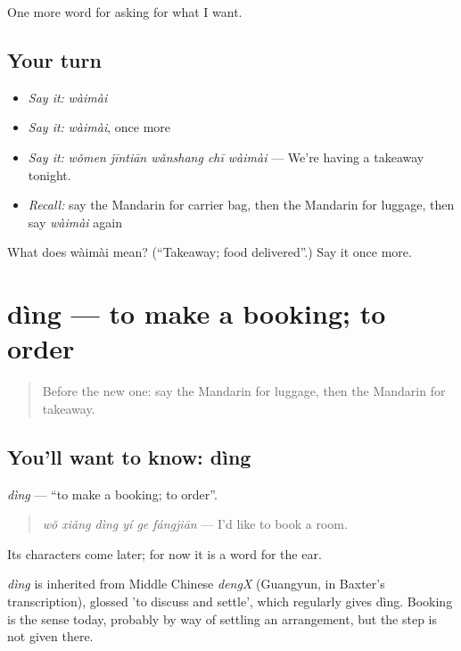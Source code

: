 \begin{grammarlens}[title={What you've built}]
One more word for asking for what I want.
\end{grammarlens}

\subsection*{Your turn}
\begin{itemize}
\raggedright
  \item \emph{Say it:} \emph{wàimài}
  \item \emph{Say it:} \emph{wàimài}, once more
  \item \emph{Say it:} \emph{wǒmen jīntiān wǎnshang chī wàimài} — We're having a takeaway tonight.
  \item \emph{Recall:} say the Mandarin for carrier bag, then the Mandarin for luggage, then say \emph{wàimài} again
\end{itemize}

\begin{tcolorbox}[breakable,colback=teal!4,colframe=teal!35!black,title={Before you move on}]
What does wàimài mean? (\textquotedblleft{}Takeaway; food delivered\textquotedblright{}.) Say it once more.
\end{tcolorbox}
\section[dìng]{dìng — to make a booking; to order}

\label{lesson:ZH-C120-ding}



\begin{quote}
Before the new one: say the Mandarin for luggage, then the Mandarin for takeaway.
\end{quote}

\subsection*{You'll want to know: dìng}
\emph{dìng} — \textquotedblleft{}to make a booking; to order\textquotedblright{}.

\begin{quote}
\emph{wǒ xiǎng dìng yí ge fángjiān} — I'd like to book a room.
\end{quote}

Its characters come later; for now it is a word for the ear.

\begin{cousinweb}
\emph{dìng} is inherited from Middle Chinese \emph{dengX} (Guangyun, in Baxter's transcription), glossed 'to discuss and settle', which regularly gives dìng. Booking is the sense today, probably by way of settling an arrangement, but the step is not given there.
\end{cousinweb}


